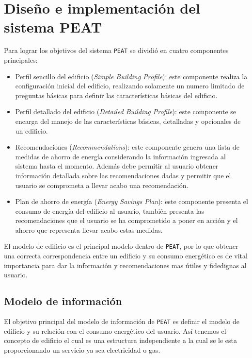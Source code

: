 \chapter{Diseño e implementación del sistema PEAT}

Para lograr los objetivos del sistema \texttt{PEAT} se dividió en cuatro
componentes principales:

\begin{itemize}
\item Perfil sencillo del edificio (\textit{Simple Building Profile}): este
  componente realiza la configuración inicial del edificio, realizando solamente
  un numero limitado de preguntas básicas para definir las características básicas
  del edificio.
\item Perfil detallado del edificio (\textit{Detailed Building Profile}):
  este componente se encarga del manejo de las características básicas, detalladas y
  opcionales de un edificio.
\item Recomendaciones (\textit{Recommendations}): este componente genera una lista
  de medidas de ahorro de energía considerando la información ingresada al sistema
  hasta el momento. Además debe permitir al usuario obtener información detallada
  sobre las recomendaciones dadas y permitir que el usuario se comprometa a
  llevar acabo una recomendación.
\item Plan de ahorro de energía (\textit{Energy Savings Plan}): este componente
  presenta el consumo de energía del edificio al usuario, también presenta las
  recomendaciones que el usuario se ha comprometido a poner en acción y el
  ahorro que representa llevar acabo estas medidas.
\end{itemize}

El  modelo de edificio es el principal modelo dentro de \texttt{PEAT}, por lo que
obtener una correcta correspondencia entre un edificio y su consumo energético
es de vital importancia para dar la información y recomendaciones mas útiles y
fidedignas al usuario.

\section{Modelo de información}

El objetivo principal del modelo de información de \texttt{PEAT} es definir el
modelo de edificio y su relación con el consumo energético del usuario. Así
tenemos el concepto de edificio el cual es una estructura independiente a la
cual se le esta proporcionando un servicio ya sea electricidad o gas.

